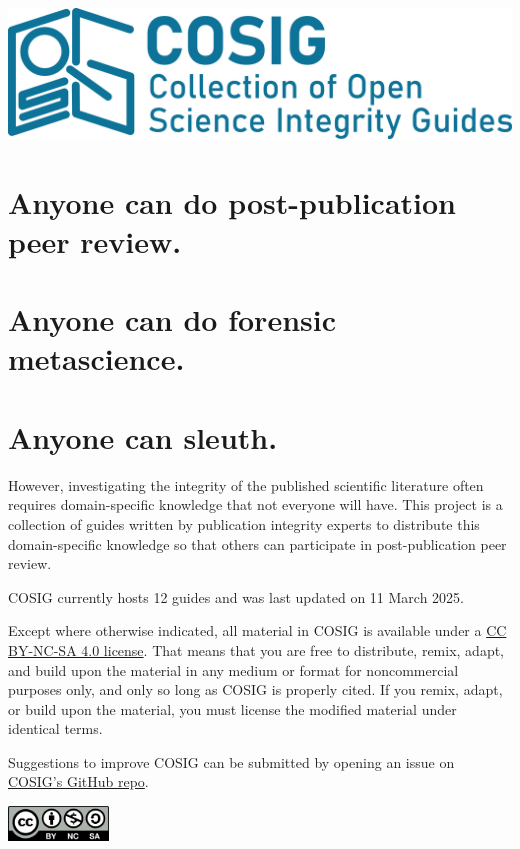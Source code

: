 \documentclass[letterpaper, 12pt]{article}
\begin{document}
\flushleft
\includegraphics[width=\textwidth]{img/home/241017_final_logo_mockup.png}

\section*{Anyone can do post-publication peer review.}
\section*{Anyone can do forensic metascience.}
\section*{Anyone can sleuth.}

However, investigating the integrity of the published scientific literature often requires domain-specific knowledge that not everyone will have. This project is a collection of guides written by publication integrity experts to distribute this domain-specific knowledge so that others can participate in post-publication peer review.

COSIG currently hosts 12 guides and was last updated on 11 March 2025.

Except where otherwise indicated, all material in COSIG is available under a \href{https://creativecommons.org/licenses/by-nc-sa/4.0/deed.en}{CC BY-NC-SA 4.0 license}. That means that you are free to distribute, remix, adapt, and build upon the material in any medium or format for noncommercial purposes only, and only so long as COSIG is properly cited. If you remix, adapt, or build upon the material, you must license the modified material under identical terms.

Suggestions to improve COSIG can be submitted by opening an issue on \href{https://github.com/reeserich/cosig/issues}{COSIG's GitHub repo}.

\includegraphics[width=0.2\textwidth]{img/home/Cc-by-nc-sa_icon.svg.png}
\end{document}
